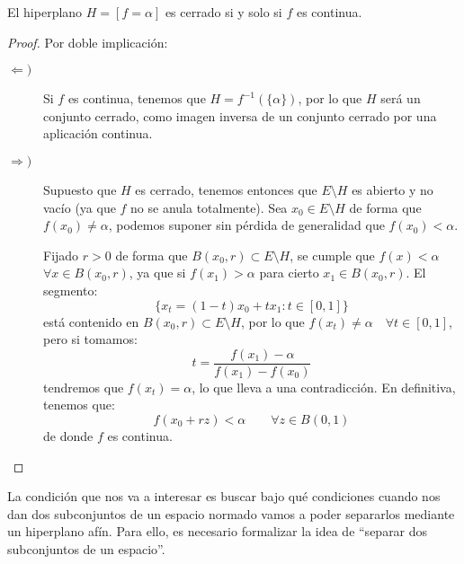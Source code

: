 \begin{prop}
    El hiperplano $H = [f=\alpha]$ es cerrado si y solo si $f$ es continua.
    \begin{proof}
        Por doble implicación:
        \begin{description}
            \item [$\Longleftarrow )$] Si $f$ es continua, tenemos que $H = f^{-1}(\{\alpha\})$, por lo que $H$ será un conjunto cerrado, como imagen inversa de un conjunto cerrado por una aplicación continua.
            \item [$\Longrightarrow )$] Supuesto que $H$ es cerrado, tenemos entonces que $E\setminus H$ es abierto y no vacío (ya que $f$ no se anula totalmente). Sea $x_0\in E\setminus H$ de forma que $f(x_0)\neq \alpha$, podemos suponer sin pérdida de generalidad que $f(x_0)<\alpha$.

                Fijado $r>0$ de forma que $B(x_0,r)\subset E\setminus H$, se cumple que $f(x)<\alpha$\newline$\forall x\in B(x_0,r)$, ya que si $f(x_1)> \alpha$ para cierto $x_1\in B(x_0,r)$. El segmento:
                \begin{equation*}
                    \{x_t = (1-t)x_0 + tx_1 : t\in [0,1]\} 
                \end{equation*}
                está contenido en $B(x_0,r)\subset E\setminus H$, por lo que $f(x_t)\neq \alpha\quad \forall t\in [0,1]$, pero si tomamos:
                \begin{equation*}
                    t = \frac{f(x_1)-\alpha}{f(x_1)-f(x_0)}
                \end{equation*}
                tendremos que $f(x_t) = \alpha$, lo que lleva a una contradicción. En definitiva, tenemos que:
                \begin{equation*}
                    f(x_0+rz)<\alpha \qquad \forall z\in B(0,1)
                \end{equation*}
                de donde $f$ es continua.
        \end{description}
    \end{proof}
\end{prop}

\noindent
La condición que nos va a interesar es buscar bajo qué condiciones cuando nos dan dos subconjuntos de un espacio normado vamos a poder separarlos mediante un hiperplano afín. Para ello, es necesario formalizar la idea de ``separar dos subconjuntos de un espacio''.

